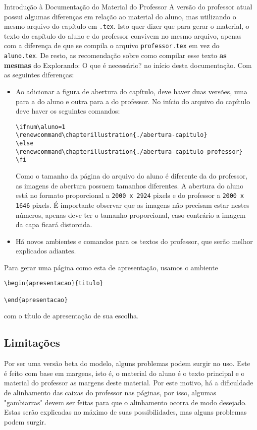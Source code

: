 \mainmatter


\begin{apresentacao}{Introdução à Documentação do Material do Professor}
A versão do professor atual possui algumas diferenças em relação ao material do aluno, mas utilizando o mesmo arquivo do capítulo em \verb|.tex|. Isto quer dizer que para gerar o material, o texto do capítulo do aluno e do professor convivem no mesmo arquivo, apenas com a diferença de que se compila o arquivo \verb|professor.tex| em vez do \verb|aluno.tex|. De resto, as recomendação sobre como compilar esse texto \textbf{as mesmas} do \textcolor{session1}{Explorando: O que é necessário?} no início desta documentação. Com as seguintes diferenças:
\begin{itemize}
\item Ao adicionar a figura de abertura do capítulo, deve haver duas versões, uma para a do aluno e outra para a do professor. No início do arquivo do capítulo deve haver os seguintes comandos:
\begin{verbatim}
\ifnum\aluno=1
\renewcommand\chapterillustration{./abertura-capitulo}
\else
\renewcommand\chapterillustration{./abertura-capitulo-professor}
\fi
\end{verbatim}
Como o tamanho da página do arquivo do aluno é diferente da do professor, as imagens de abertura possuem tamanhos diferentes. A abertura do aluno está no formato proporcional a \verb|2000 x 2924| pixels e do professor a \verb|2000 x 1646| pixels. É importante observar que as imagens não precisam estar nestes números, apenas deve ter o tamanho proporcional, caso contrário a imagem da capa ficará distorcida.

\item Há novos ambientes e comandos para os textos do professor, que serão melhor explicados adiantes.
\end{itemize}

Para gerar uma página como esta de apresentação, usamos o ambiente
\begin{verbatim}
\begin{apresentacao}{titulo}

\end{apresentacao}
\end{verbatim}
com o título de apresentação de sua escolha.  

\subsection{Limitações}
Por ser uma versão beta do modelo, alguns problemas podem surgir no uso. Este é feito com base em margens, isto é, o material do aluno é o texto principal e o material do professor as margens deste material. Por este motivo, há a dificuldade de alinhamento das caixas do professor nas páginas, por isso, algumas "gambiarras"{} devem ser feitas para que o alinhamento ocorra de modo desejado. Estas serão explicadas no máximo de suas possibilidades, mas alguns problemas podem surgir. 


\end{apresentacao}
